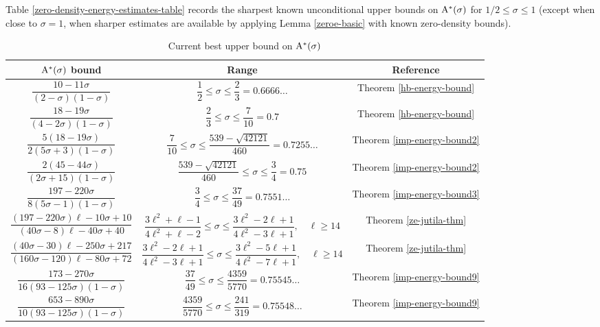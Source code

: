 Table \ref{zero-density-energy-estimates-table} records the sharpest known unconditional upper bounds on $\mathrm{A}^*(\sigma)$ for $1/2 \le \sigma \le 1$ (except when close to $\sigma = 1$, when sharper estimates are available by applying Lemma \ref{zeroe-basic} with known zero-density bounds).
\begin{table}[ht]
    \def\arraystretch{2}
    \centering
    \caption{Current best upper bound on $\mathrm{A}^*(\sigma)$}
    \begin{tabular}{|c|c|c|}
    \hline
    $\mathrm{A}^*(\sigma)$ bound & Range & Reference\\
    \hline
    $\dfrac{10 - 11\sigma}{(2 - \sigma)(1 - \sigma)}$ & $\dfrac{1}{2} \leq \sigma \le \dfrac{2}{3} = 0.6666\ldots$ & Theorem \ref{hb-energy-bound}\\
    \hline
    $\dfrac{18 - 19\sigma}{(4 - 2\sigma)(1 - \sigma)}$ & $\dfrac{2}{3} \leq \sigma \le \dfrac{7}{10} = 0.7$ & Theorem \ref{hb-energy-bound}\\
    \hline
    $\dfrac{5(18 - 19\sigma)}{2(5\sigma + 3)(1 - \sigma)}$ & $\dfrac{7}{10} \leq \sigma \le \dfrac{539 - \sqrt{42121}}{460} = 0.7255\ldots$ & Theorem \ref{imp-energy-bound2}\\
    \hline
    $\dfrac{2(45 - 44\sigma)}{(2\sigma + 15)(1 - \sigma)}$ & $\dfrac{539 - \sqrt{42121}}{460} \leq \sigma \le \dfrac{3}{4} = 0.75$ & Theorem \ref{imp-energy-bound2}\\
    \hline
    $\dfrac{197 - 220\sigma}{8(5\sigma - 1)(1 - \sigma)}$ & $\dfrac{3}{4} \leq \sigma \le \dfrac{37}{49} = 0.7551\ldots$ & Theorem \ref{imp-energy-bound3}\\
    \hline

    $\dfrac{(197 - 220\sigma)\ell - 10\sigma + 10}{(40\sigma - 8)\ell - 40\sigma + 40}$ & $\dfrac{3\ell^2 + \ell - 1}{4\ell^2 + \ell - 2} \leq \sigma \le \dfrac{3\ell^2 - 2\ell + 1}{4\ell^2 - 3\ell + 1},\quad \ell \ge 14$ & Theorem \ref{ze-jutila-thm}\\
    \hline
    $\dfrac{(40\sigma - 30)\ell - 250\sigma + 217}{(160\sigma - 120)\ell - 80\sigma + 72}$ & $\dfrac{3\ell^2 - 2\ell + 1}{4\ell^2 - 3\ell + 1} \leq \sigma \le \dfrac{3\ell^2 -5\ell + 1}{4\ell^2 -7\ell + 1},\quad \ell \ge 14$ & Theorem \ref{ze-jutila-thm}\\
    \hline
    
    $\dfrac{173 - 270\sigma}{16(93 - 125\sigma)(1-\sigma)}$ & $\dfrac{37}{49} \le \sigma \le \dfrac{4359}{5770} = 0.75545\ldots$ & Theorem \ref{imp-energy-bound9}\\
    \hline
    $\dfrac{653 - 890\sigma}{10(93 - 125\sigma)(1-\sigma)}$ & $\dfrac{4359}{5770} \le \sigma \le \dfrac{241}{319} = 0.75548\ldots$ & Theorem \ref{imp-energy-bound9}\\
    \hline


\end{tabular}
\end{table}
